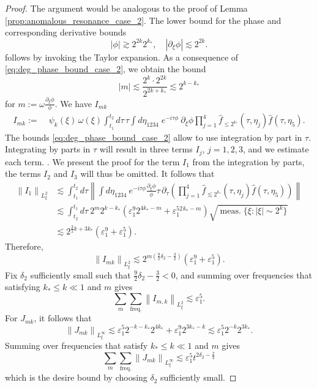 \documentclass[reqno,english,11pt]{amsart}
\newcommand{\eps}{\varepsilon}
\newcommand{\snorm}[1]{\left\|#1\right\|}
\theoremstyle{definition}
\numberwithin{equation}{section}
\begin{document}
\begin{proof}
The argument would be analogous to the proof of Lemma  \ref{prop:anomalous_resonance_case_2}. The lower bound for the phase and corresponding derivative bounds \begin{equation}\label{eq:deg_phase_bound_case_2}
        |\phi|\gtrsim 2^{2k} 2^{k_*},\quad
        |\partial_\xi  \phi|\lesssim 2^{2k}.
\end{equation}
follows by invoking the Taylor expansion. As a consequence of \eqref{eq:deg_phase_bound_case_2}, we obtain the bound
\begin{equation}\label{eq:symbol_ratio_bound}
\left|m\right|\lesssim\frac{2^{k}\cdot 2^{2k}}{2^{2k+k_*}}\lesssim
2^{k-k_*}
\end{equation}
for $m:=\omega\frac{\partial_\xi \phi}{\phi}$. We have $I_{mk}$
\begin{align*}
I_{mk}:=\;&\psi_k(\xi)\,\omega(\xi)\!\int_{t_1}^{t_2}d\tau\,\tau
\int d\eta_{1234} \;e^{-i\tau \phi}\ \partial_{\xi}\phi \prod^{4}_{j=1}
    \widehat{f}_{\leq 2^{k_*}}(\tau,\eta_j)\widehat{f}(\tau,\eta_5).
\end{align*}
The bounds \eqref{eq:deg_phase_bound_case_2} allow to use integration by part in $\tau$. Integrating by parts in $\tau$ will result in three terms $I_j$, $j=1,2,3$, and we   estimate each term. . 
We present the proof for the term  $I_1$ from the integration by parts, the terms $I_2$ and $I_3$ will thus be omitted. It follows that
\begin{align*}
    \snorm{I_1}_{L^2_\xi}&\lesssim \int^{t_2}_{t_1}d\tau \snorm{\int d\eta_{1234}  \ e^{-i\tau\phi} \frac{\partial_{\xi}\phi}{\phi}  \tau \, \partial_{\tau}\left(  \prod^4_{j=1}\widehat{f}_{\lesssim 2^{k_{*}}} \left(\tau,\eta_{j}\right) 
    \widehat{f}\left(\tau,\eta_{5}\right)  \right) }\\
    &\lesssim \int^{t_1}_{t_2} d\tau \ 2^{m}2^{k-k_*}\left(\eps^9_1 2^{4k_*-m}+\eps_1^52^{k_*-m}\right)\sqrt{\operatorname{meas.}\{\xi: \vert \xi\vert\sim 2^{k}\}}\\
    &\lesssim 2^{\frac{3}{2}k+3k_*}(\eps^9_1+\eps_1^5).
\end{align*}
Therefore,
$$\snorm{I_{mk}}_{L^2_\xi}\lesssim 2^{m(\frac{9}{2}\delta_2-\frac{3}{2})}\left(\eps^9_1 +\eps_1^5\right).$$
Fix $\delta_2$ sufficiently small such that $\frac{9}{2}\delta_2-\frac{3}{2}<0$, and summing over frequencies that satisfying $k_*\leq k\ll 1$ and $m$ gives
$$\sum_{m}\sum_{\operatorname{freq.}}\snorm{I_{m,k}}_{L^2_\xi}\lesssim \eps_1^5.$$
For $J_{mk}$, it follows that
$$\snorm{J_{mk}}_{L^\infty_\xi}\lesssim \eps_1^5 2^{-k-k_*}2^{4k_*}+\eps^9_1 2^{3k_*-k}\lesssim \eps_1^5 2^{-k}2^{3k_*}.$$
Summing over frequencies that satisfy $k_*\leq k\ll 1$ and $m$ gives
$$\sum_m\sum_{\operatorname{freq.}}\snorm{J_{mk}}_{L^\infty_\xi}\lesssim \eps_1^5 t^{2\delta_2-\frac{2}{3}}$$
which is the desire bound by choosing $\delta_2$ sufficiently small.    
\end{proof}
\end{document}
